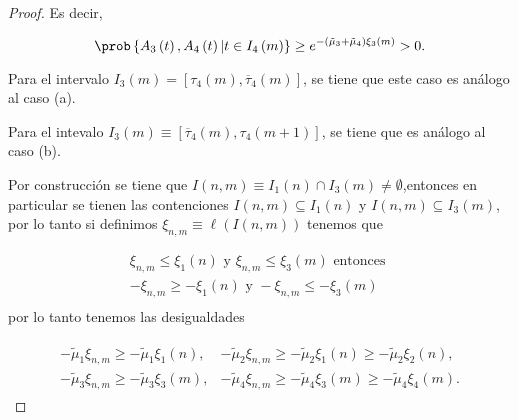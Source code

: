 \begin{proof}
Es decir, 

\begin{equation}
\prob\left\{A_{3}\left(t\right),A_{4}\left(t\right)|t\in I_{4}\left(m\right)\right\}\geq
e^{-\left(\tilde{\mu}_{3}+\tilde{\mu}_{4}\right)\xi_{3}\left(m\right)}>0.
\end{equation}


Para el intervalo $I_{3}\left(m\right)=\left[\tau_{4}\left(m\right),\overline{\tau}_{4}\left(m\right)\right]$, se tiene que este caso es an\'alogo al caso (a).


Para el intevalo $I_{3}\left(m\right)\equiv\left[\overline{\tau}_{4}\left(m\right),\tau_{4}\left(m+1\right)\right]$, se tiene que es an\'alogo al caso (b).


Por construcci\'on se tiene que $I\left(n,m\right)\equiv I_{1}\left(n\right)\cap I_{3}\left(m\right)\neq\emptyset$,entonces en particular se tienen las contenciones $I\left(n,m\right)\subseteq I_{1}\left(n\right)$ y $I\left(n,m\right)\subseteq I_{3}\left(m\right)$, por lo tanto si definimos $\xi_{n,m}\equiv\ell\left(I\left(n,m\right)\right)$ tenemos que

\begin{eqnarray*}
\xi_{n,m}\leq\xi_{1}\left(n\right)\textrm{ y }\xi_{n,m}\leq\xi_{3}\left(m\right)\textrm{ entonces }\\
-\xi_{n,m}\geq-\xi_{1}\left(n\right)\textrm{ y }-\xi_{n,m}\leq-\xi_{3}\left(m\right)\\
\end{eqnarray*}
por lo tanto tenemos las desigualdades 


\begin{eqnarray*}
\begin{array}{ll}
-\tilde{\mu}_{1}\xi_{n,m}\geq-\tilde{\mu}_{1}\xi_{1}\left(n\right),&
-\tilde{\mu}_{2}\xi_{n,m}\geq-\tilde{\mu}_{2}\xi_{1}\left(n\right)
\geq-\tilde{\mu}_{2}\xi_{2}\left(n\right),\\
-\tilde{\mu}_{3}\xi_{n,m}\geq-\tilde{\mu}_{3}\xi_{3}\left(m\right),&
-\tilde{\mu}_{4}\xi_{n,m}\geq-\tilde{\mu}_{4}\xi_{3}\left(m\right)
\geq-\tilde{\mu}_{4}\xi_{4}\left(m\right).
\end{array}
\end{eqnarray*}


\end{proof}
